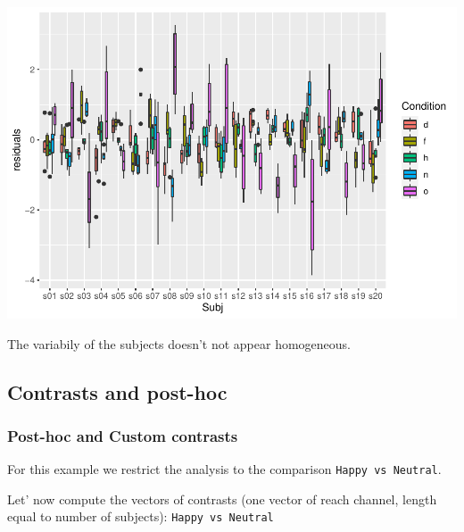 \documentclass[
]{article}
\begin{document}
\includegraphics{perm_repeated_measures_files/figure-latex/unnamed-chunk-12-1.pdf}

The variabily of the subjects doesn't not appear homogeneous.

\hypertarget{contrasts-and-post-hoc}{%
\subsection{Contrasts and post-hoc}\label{contrasts-and-post-hoc}}

\hypertarget{post-hoc-and-custom-contrasts}{%
\subsubsection{Post-hoc and Custom
contrasts}\label{post-hoc-and-custom-contrasts}}

For this example we restrict the analysis to the comparison
\texttt{Happy\ vs\ Neutral}.

Let' now compute the vectors of contrasts (one vector of reach channel,
length equal to number of subjects): \texttt{Happy\ vs\ Neutral}
\end{document}
